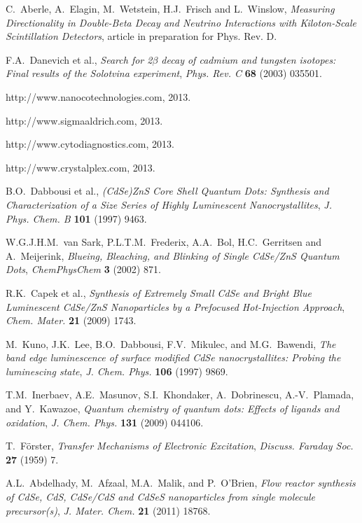\documentclass[cits]{JINST}
\begin{document}
\begin{thebibliography}{9}
C.~Aberle, A.~Elagin, M.~Wetstein, H.J.~Frisch and L.~Winslow, \emph{Measuring Directionality in Double-Beta Decay and Neutrino Interactions with Kiloton-Scale Scintillation Detectors}, article in preparation for Phys. Rev. D. 
 
F.A.~Danevich et al., \emph{Search for 2$\beta$ decay of cadmium and tungsten isotopes: Final results of the Solotvina experiment}, \emph{Phys. Rev. C} {\bf 68} (2003) 035501.

http://www.nanocotechnologies.com, 2013. 

http://www.sigmaaldrich.com, 2013. 

http://www.cytodiagnostics.com, 2013.

http://www.crystalplex.com, 2013. 

B.O.~Dabbousi et al., \emph{(CdSe)ZnS Core Shell Quantum Dots: Synthesis and Characterization of a Size Series of Highly Luminescent Nanocrystallites}, \emph{J. Phys. Chem. B} {\bf 101} (1997) 9463.

W.G.J.H.M.~van Sark, P.L.T.M.~Frederix, A.A.~Bol, H.C.~Gerritsen and A.~Meijerink, \emph{Blueing, Bleaching, and Blinking of Single CdSe/ZnS Quantum Dots}, \emph{ChemPhysChem} {\bf 3} (2002) 871.

R.K.~Capek et al., \emph{Synthesis of Extremely Small CdSe and Bright Blue Luminescent CdSe/ZnS Nanoparticles by a Prefocused Hot-Injection Approach}, \emph{Chem. Mater.} {\bf 21} (2009) 1743.

M.~Kuno, J.K.~Lee, B.O.~Dabbousi, F.V.~Mikulec, and M.G.~Bawendi, \emph{The band edge luminescence of surface modified CdSe nanocrystallites: Probing the luminescing state}, \emph{J. Chem. Phys.} {\bf 106} (1997) 9869.

T.M.~Inerbaev, A.E.~Masunov, S.I.~Khondaker, A.~Dobrinescu, A.-V.~Plamada, and Y.~Kawazoe, \emph{Quantum chemistry of quantum dots: Effects of ligands and oxidation}, \emph{J. Chem. Phys.} {\bf 131} (2009) 044106. 

T.~F\"{o}rster, \emph{Transfer Mechanisms of Electronic Excitation}, \emph{Discuss. Faraday Soc.} {\bf 27} (1959) 7.

A.L.~Abdelhady, M.~Afzaal, M.A.~Malik, and P.~O'Brien, \emph{Flow reactor synthesis of CdSe, CdS, CdSe/CdS and CdSeS nanoparticles from single molecule precursor(s)}, \emph{J. Mater. Chem.} {\bf 21} (2011) 18768.


\end{thebibliography}
\end{document}
